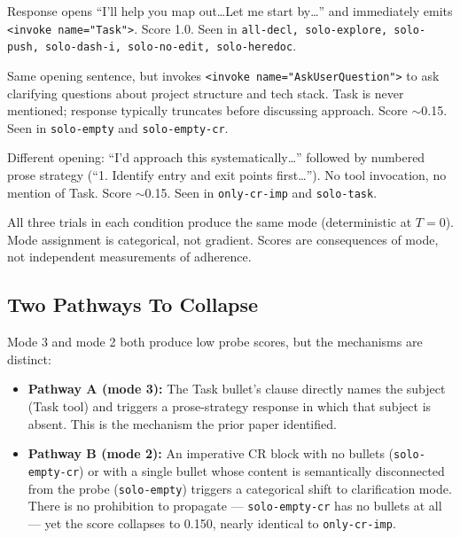 \documentclass[11pt,a4paper]{article}
\begin{document}
\begin{description}[leftmargin=*, itemsep=2pt]
\item[Mode 1 (Task-invoke, default):] Response opens ``I'll help
you map out\ldots Let me start by\ldots'' and immediately emits
\texttt{<invoke name="Task">}. Score 1.0. Seen in
\texttt{all-decl, solo-explore, solo-push, solo-dash-i, solo-no-edit,
solo-heredoc}.

\item[Mode 2 (AskUserQuestion):] Same opening sentence, but invokes
\texttt{<invoke name="AskUserQuestion">} to ask clarifying questions
about project structure and tech stack. Task is never mentioned;
response typically truncates before discussing approach. Score $\sim$0.15.
Seen in \texttt{solo-empty} and \texttt{solo-empty-cr}.

\item[Mode 3 (prose-strategy):] Different opening: ``I'd approach
this systematically\ldots'' followed by numbered prose strategy
(``1. Identify entry and exit points first\ldots''). No tool
invocation, no mention of Task. Score $\sim$0.15. Seen in
\texttt{only-cr-imp} and \texttt{solo-task}.
\end{description}

All three trials in each condition produce the same mode (deterministic
at $T=0$). Mode assignment is categorical, not gradient. Scores are
consequences of mode, not independent measurements of adherence.

\subsection{Two Pathways To Collapse}

Mode 3 and mode 2 both produce low probe scores, but the mechanisms
are distinct:

\begin{itemize}[leftmargin=*]
\item \textbf{Pathway A (mode 3):} The Task bullet's clause directly
names the subject (Task tool) and triggers a prose-strategy response
in which that subject is absent. This is the mechanism the prior
paper identified.

\item \textbf{Pathway B (mode 2):} An imperative CR block with no
bullets (\texttt{solo-empty-cr}) or with a single bullet whose
content is semantically disconnected from the probe
(\texttt{solo-empty}) triggers a categorical shift to clarification
mode. There is no prohibition to propagate --- \texttt{solo-empty-cr}
has no bullets at all --- yet the score collapses to 0.150, nearly
identical to \texttt{only-cr-imp}.
\end{itemize}
\end{document}
